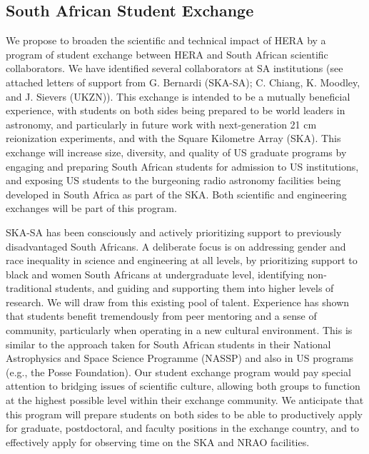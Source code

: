 \documentclass[preprint]{aastex}
\newcommand{\compress}{\vspace{-0.3in}}
\begin{document}
\compress
\subsection{South African Student Exchange}

We propose to broaden the scientific and technical impact of HERA by a program of student exchange between HERA and South African scientific collaborators.  We have identified several collaborators at SA institutions (see attached letters of support from G. Bernardi (SKA-SA); C. Chiang, K. Moodley, and J. Sievers (UKZN)).  This exchange is intended to be a mutually beneficial experience, with students on both sides being prepared to be world leaders in astronomy, and particularly in future work with next-generation 21 cm reionization experiments, and with the Square Kilometre Array (SKA).  This exchange will increase size, diversity, and quality of US graduate programs by engaging and preparing South African students for admission to US institutions, and exposing US students to the burgeoning radio astronomy facilities being developed in South Africa as part of the SKA. Both scientific and engineering exchanges will be part of this program.  

SKA-SA has been consciously and actively prioritizing support to previously disadvantaged South Africans.  A deliberate focus is on addressing gender and race inequality in science and engineering at all levels, by prioritizing support to black and women South Africans at undergraduate level, identifying non-traditional students, and guiding and supporting them into higher levels of research.  We will draw from this existing pool of talent.  
Experience has shown that students benefit tremendously from peer mentoring and a sense of community, particularly when operating in a new cultural environment.  This is similar to the approach taken for South African students in their National Astrophysics and Space Science Programme (NASSP)
and also in US programs (e.g., the Posse Foundation).
Our student exchange program would pay special attention to bridging issues of scientific culture, allowing both groups to function at the highest possible level within their exchange community.  We anticipate that this program will prepare students on both sides to be able to productively apply for graduate, postdoctoral, and faculty positions in the exchange country, and to effectively apply for observing time on the SKA and NRAO facilities.  
\end{document}
